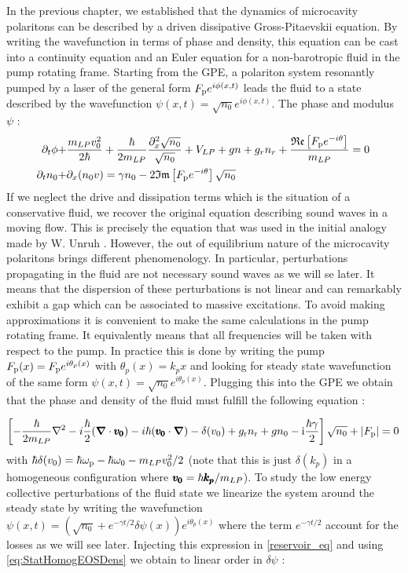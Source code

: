 In the previous chapter, we established that the dynamics of microcavity polaritons can be described by a driven dissipative Gross-Pitaevskii equation.
By writing the wavefunction in terms of phase and density, this equation can be cast into a continuity equation and an Euler equation for a non-barotropic fluid in the pump rotating frame. Starting from the GPE,
a polariton system resonantly pumped by a laser of the general form $F_{\mathrm{p}}e^{i\phi(x,t)}$ leads the fluid to a state described by the wavefunction $\psi(x,t)=\sqrt{n_0}e^{i\phi(x,t)}$. The phase and modulus $\psi$ :
\begin{equation}
    \begin{align}
    \partial_t \phi +& \frac{m_{LP} v_0^2}{2\hbar}+\frac{\hbar}{2m_{LP}}\frac{\partial_x^2\sqrt{n_0}}{\sqrt{n_0}}+V_{LP}+gn+g_rn_r+\frac{\mathfrak{Re}\left[F_{\mathrm{p}}e^{-i\theta}\right]}{m_{LP}}=0\,\\
    \partial_t n_0 +& \partial_x(n_0v)= \gamma n_0 -2\mathfrak{Im}\left[F_{\mathrm{p}}e^{-i\theta}\right]\sqrt{n_0}
    \end{align}
    \label{eq:continuity}
\end{equation}
If we neglect the drive and dissipation terms which is the situation of a conservative fluid, we recover the original equation describing 
sound waves in a moving flow. This is precisely the equation that was used in the initial analogy made by W. Unruh \cite{unruh_experimental_1981}.
However, the out of equilibrium nature of the microcavity polaritons brings different phenomenology. In particular, perturbations propagating in
the fluid are not necessary sound waves as we will se later. It means that the dispersion of these perturbations is not linear and 
can remarkably exhibit a gap which can be associated to massive excitations. To avoid making approximations it is convenient to make the same calculations in the pump rotating frame. It equivalently means that all frequencies
will be taken with respect to the pump. In practice this is done by writing the pump $F_{\mathrm{p}}(x)= F_{\mathrm{p}}e^{i\theta_p(x)}$ with $\theta_p(x)=k_px$ and looking for steady state wavefunction 
of the same form $\psi(x,t)=\sqrt{n_0}e^{i\theta_p(x)}$. Plugging this into the GPE we obtain that the phase and density of the fluid must fulfill the following equation :

\begin{equation}
    \left[-\frac{\hbar}{2m_{LP}}\nabla^2-i\frac{\hbar}{2}(\boldsymbol{\nabla}\cdot\pmb{v_0}) -i\hbar(\pmb{v_0}\cdot\boldsymbol{\nabla})- \delta(v_0)+g_{\rm r}n_{\rm r}+g n_0-\mathrm{i}\frac{\hbar\gamma}{2}\right]\sqrt{n_0}+|F_{\mathrm{p}}|=0\,
        \label{eq:StatHomogEOSDens}
\end{equation}
with $\hbar \delta(v_0)=\hbar\omega_{\mathrm{p}}-\hbar\omega_0-m_{LP} v_0^2/2$ (note that this is just $\delta(k_p)$ in a homogeneous configuration where $\pmb{v_0}=\hbar\pmb{k_p}/m_{LP}$).
To study the low energy collective perturbations of the fluid state we linearize the system around the steady state by writing the wavefunction
$\psi(x,t)=(\sqrt{n_0}+e^{-\gamma t/2}\delta\psi(x))e^{i\theta_p(x)}$ where the term $e^{-\gamma t/2}$ account for the losses as we will see later. Injecting this expression in \autoref{reservoir_eq} and using \autoref{eq:StatHomogEOSDens} we obtain to linear order in $\delta\psi$ :

